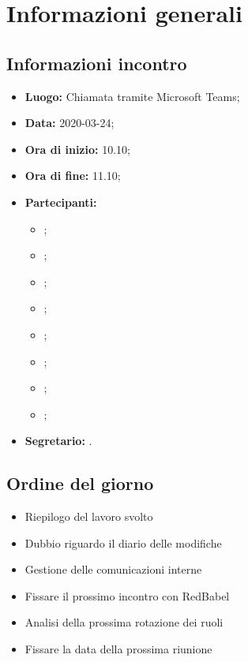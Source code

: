 \section{Informazioni generali}
\subsection{Informazioni incontro}
\begin{itemize}
	\item \textbf{Luogo:} Chiamata tramite Microsoft Teams; 
	\item \textbf{Data:} 2020-03-24;
	\item \textbf{Ora di inizio:} 10.10; 
	\item \textbf{Ora di fine:} 11.10; 
	\item \textbf{Partecipanti:}
		\begin{itemize}
			\item \VB; 
			\item \LB; 
			\item \NF; 
			\item \EG; 
			\item \FJ; 
			\item \MP; 
			\item \AS; 
			\item \AZ; 
		\end{itemize}
	\item \textbf{Segretario:} \MP. 
\end{itemize}

\subsection{Ordine del giorno}
\begin{itemize}
	\item Riepilogo del lavoro svolto
	\item Dubbio riguardo il diario delle modifiche
	\item Gestione delle comunicazioni interne
	\item Fissare il prossimo incontro con RedBabel
	\item Analisi della prossima rotazione dei ruoli
	\item Fissare la data della prossima riunione
\end{itemize}
